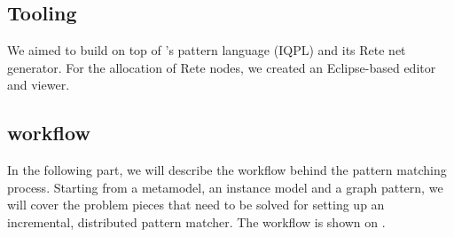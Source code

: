 \subsection{Tooling}

We aimed to build \iqd{} on top of \eiq{}'s pattern language (IQPL) and its Rete net generator. For the allocation of Rete nodes, we created an Eclipse-based editor and viewer.


\subsection{workflow}
 
In the following part, we will describe the workflow behind the pattern matching process. Starting from a metamodel, an instance model and a graph pattern, we will cover the problem pieces that need to be solved for setting up an incremental, distributed pattern matcher. The workflow is shown on .


